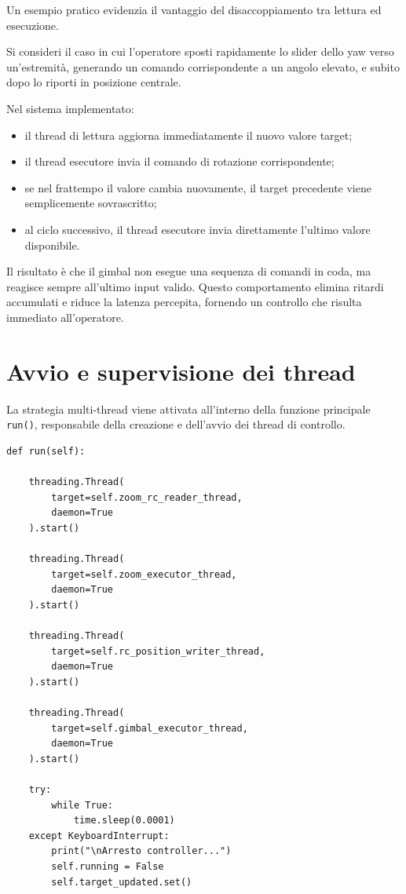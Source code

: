 \bigskip
\noindent
Un esempio pratico evidenzia il vantaggio del disaccoppiamento tra lettura ed esecuzione.

Si consideri il caso in cui l’operatore sposti rapidamente lo slider dello yaw
verso un’estremità, generando un comando corrispondente a un angolo elevato,
e subito dopo lo riporti in posizione centrale.

Nel sistema implementato:

\begin{itemize}
    \item il thread di lettura aggiorna immediatamente il nuovo valore target;
    \item il thread esecutore invia il comando di rotazione corrispondente;
    \item se nel frattempo il valore cambia nuovamente, il target precedente viene semplicemente sovrascritto;
    \item al ciclo successivo, il thread esecutore invia direttamente l’ultimo valore disponibile.
\end{itemize}

Il risultato è che il gimbal non esegue una sequenza di comandi in coda,
ma reagisce sempre all’ultimo input valido.
Questo comportamento elimina ritardi accumulati e riduce la latenza percepita,
fornendo un controllo che risulta immediato all’operatore.

\bigskip
\section*{Avvio e supervisione dei thread}

\bigskip

La strategia multi-thread viene attivata all’interno della funzione principale
\texttt{run()}, responsabile della creazione e dell’avvio dei thread di controllo.

\begin{verbatim}
def run(self):

    threading.Thread(
        target=self.zoom_rc_reader_thread,
        daemon=True
    ).start()

    threading.Thread(
        target=self.zoom_executor_thread,
        daemon=True
    ).start()

    threading.Thread(
        target=self.rc_position_writer_thread,
        daemon=True
    ).start()

    threading.Thread(
        target=self.gimbal_executor_thread,
        daemon=True
    ).start()

    try:
        while True:
            time.sleep(0.0001)
    except KeyboardInterrupt:
        print("\nArresto controller...")
        self.running = False
        self.target_updated.set()
\end{verbatim}

